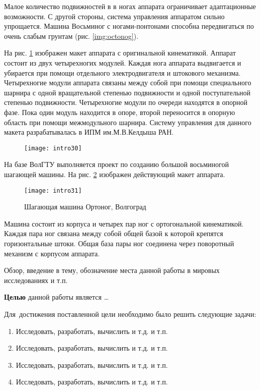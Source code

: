 Малое количество подвижностей в в ногах аппарата ограничивает адаптационные возможности. С другой стороны, система управления аппаратом сильно упрощается. Машина Восьминог с ногами-понтонами способна передвигаться по очень слабым грунтам (рис. \ref{img:octonog}).

На рис. \ref{img:ortho} изображен макет аппарата с оригинальной кинематикой. Аппарат состоит из двух четырехногих модулей. Каждая нога аппарата выдвигается и убирается при помощи отдельного электродвигателя и штокового механизма. Четырехногие модули аппарата связаны между собой при помощи специального шарнира с одной вращательной степенью подвижности и одной поступательной степенью подвижности. Четырехногие модули по очереди находятся в опорной фазе. Пока один модуль находится в опоре, второй переносится в опорную область при помощи межмодульного шарнира. Систему управления для данного макета разрабатывалась в ИПМ им.М.В.Келдыша РАН.

\begin{figure}
\centering
\texttt{[image: intro30]}
\caption{}
\label{img:ortho}
\end{figure}

На базе ВолГТУ выполняется проект по созданию большой восьминогой шагающей машины. На рис. \ref{img:ortho2} изображен действующий макет аппарата.

\begin{figure}
\centering
\texttt{[image: intro31]}
\caption{Шагающая машина Ортоног, Волгоград}
\label{img:ortho2}
\end{figure}

Машина состоит из корпуса и четырех пар ног с ортогональной кинематикой. Каждая пара ног связана между собой общей базой к которой крепятся горизонтальные штоки. Общая база пары ног соединена через поворотный механизм с корпусом аппарата.
\clearpage

Обзор, введение в тему, обозначение места данной работы в мировых исследованиях и т.п.

\textbf{Целью} данной работы является \ldots

Для~достижения поставленной цели необходимо было решить следующие задачи:
\begin{enumerate}
  \item Исследовать, разработать, вычислить и т.д. и т.п.
  \item Исследовать, разработать, вычислить и т.д. и т.п.
  \item Исследовать, разработать, вычислить и т.д. и т.п.
  \item Исследовать, разработать, вычислить и т.д. и т.п.
\end{enumerate}

